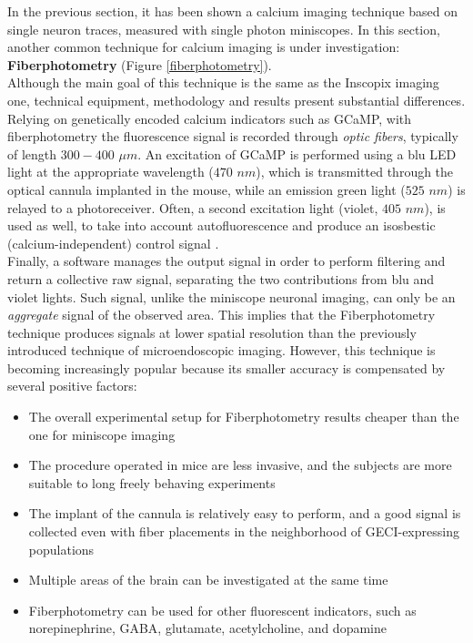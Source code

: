 \documentclass[12pt, a4paper]{report}
\begin{document}
In the previous section, it has been shown a calcium imaging technique based on single neuron traces, measured with single photon miniscopes. In this section, another common technique for calcium imaging is under investigation: \textbf{Fiberphotometry} (Figure \ref{fiberphotometry}). \\
Although the main goal of this technique is the same as the Inscopix imaging one, technical equipment, methodology and results present substantial differences.\\
Relying on genetically encoded calcium indicators such as GCaMP, with fiberphotometry the fluorescence signal is recorded through \textit{optic fibers}, typically of length $300-400$ $ \mu m$. An excitation of GCaMP is performed using a blu LED light at the appropriate wavelength ($470$ $ nm$), which is transmitted through the optical cannula implanted in the mouse, while an emission green light ($525$ $ nm$) is relayed to a photoreceiver. Often, a second excitation light (violet, $405$ $nm$), is used as well, to take into account autofluorescence and produce an isosbestic (calcium-independent) control signal \cite{12}. \\%
 Finally, a software manages the output signal in order to perform filtering and return a collective raw signal, separating the two contributions from blu and violet lights. Such signal, unlike the miniscope neuronal imaging, can only be an \textit{aggregate} signal of the observed area. This implies that the Fiberphotometry technique produces signals at lower spatial resolution than the previously introduced technique of microendoscopic imaging. However, this technique is becoming increasingly popular because its smaller accuracy is compensated by several positive factors:

\begin{itemize}
	
	\item The overall experimental setup for Fiberphotometry results cheaper than the one for miniscope imaging 
	
	\item The procedure operated in mice are less invasive, and the subjects are more suitable to long freely behaving experiments
	
	\item The implant of the cannula is relatively easy to perform, and a good signal is collected even with fiber placements in the neighborhood of GECI-expressing populations 
	
	\item Multiple areas of the brain can be investigated at the same time 
	
	\item Fiberphotometry can be used for other fluorescent indicators, such as norepinephrine, %
	 GABA, %
	 glutamate, %
	acetylcholine, %
	and dopamine \cite{12} %
	
	
	
\end{itemize}
\end{document}
